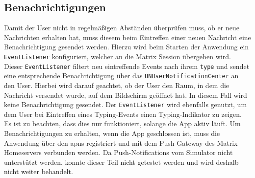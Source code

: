     \subsection{Benachrichtigungen}\label{subsec:benachrichtigungen}
    Damit der User nicht in regelmäßigen Abständen überprüfen muss, ob er neue Nachrichten erhalten hat, muss diesem beim Eintreffen einer neuen Nachricht eine Benachrichtigung gesendet werden.
    Hierzu wird beim Starten der Anwendung ein \texttt{EventListener} konfiguriert, welcher an die Matrix Session übergeben wird.
    Dieser \texttt{EventListener} filtert neu eintreffende Events nach ihrem \texttt{type} und sendet eine entsprechende Benachrichtigung über das \texttt{UNUserNotificationCenter} an den User.
    Hierbei wird darauf geachtet, ob der User den Raum, in dem die Nachricht versendet wurde, auf dem Bildschirm geöffnet hat.
    In diesem Fall wird keine Benachrichtigung gesendet.
    Der \texttt{EventListener} wird ebenfalls genutzt, um dem User bei Eintreffen eines Typing-Events einen Typing-Indikator zu zeigen.\\
    Es ist zu beachten, dass dies nur funktioniert, solange die App aktiv läuft.
    Um Benachrichtigungen zu erhalten, wenn die App geschlossen ist, muss die Anwendung über den \ac{apns} registriert und mit dem Push-Gateway des Matrix Homeservers verbunden werden.
    Da Push-Notifications vom Simulator nicht unterstützt werden, konnte dieser Teil nicht getestet werden und wird deshalb nicht weiter behandelt.

    \newpage
